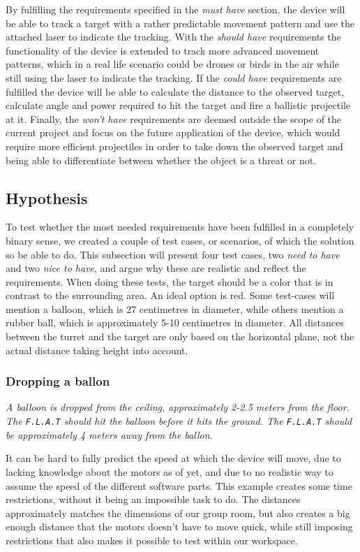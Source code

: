 By fulfilling the requirements specified in the \textit{must have} section, the device will be able to track a target with a rather predictable movement pattern and use the attached laser to indicate the tracking. 
With the \textit{should have} requirements the functionality of the device is extended to track more advanced movement patterns, which in a real life scenario could be drones or birds in the air while still using the laser to indicate the tracking.
If the \textit{could have} requirements are fulfilled the device will be able to calculate the distance to the observed target, calculate angle and power required to hit the target and fire a ballistic projectile at it.
Finally, the \textit{won't have} requirements are deemed outside the scope of the current project and focus on the future application of the device, which would require more efficient projectiles in order to take down the observed target and being able to differentiate between whether the object is a threat or not.

\subsection{Hypothesis}
To test whether the most needed requirements have been fulfilled in a completely binary sense, we created a couple of test cases, or scenarios, of which the solution so be able to do. 
This subsection will present four test cases, two \textit{need to have} and two \textit{nice to have}, and argue why these are realistic and reflect the requirements.
When doing these tests, the target should be a color that is in contrast to the surrounding area.
An ideal option is red.
Some test-cases will mention a balloon, which is 27 centimetres in diameter, while others mention a rubber ball, which is approximately 5-10 centimetres in diameter.
All distances between the turret and the target are only based on the horizontal plane, not the actual distance taking height into account.

\subsubsection{Dropping a ballon}
\textit{A balloon is dropped from the ceiling, approximately 2-2.5 meters from the floor.	
The \texttt{F.L.A.T} should hit the balloon before it hits the ground.
The \texttt{F.L.A.T} should be approximately 4 meters away from the ballon.}

It can be hard to fully predict the speed at which the device will move, due to lacking knowledge about the motors as of yet, and due to no realistic way to assume the speed of the different software parts.
This example creates some time restrictions, without it being an impossible task to do.
The distances approximately matches the dimensions of our group room, but also creates a big enough distance that the motors doesn't have to move quick, while still imposing restrictions that also makes it possible to test within our workspace.

